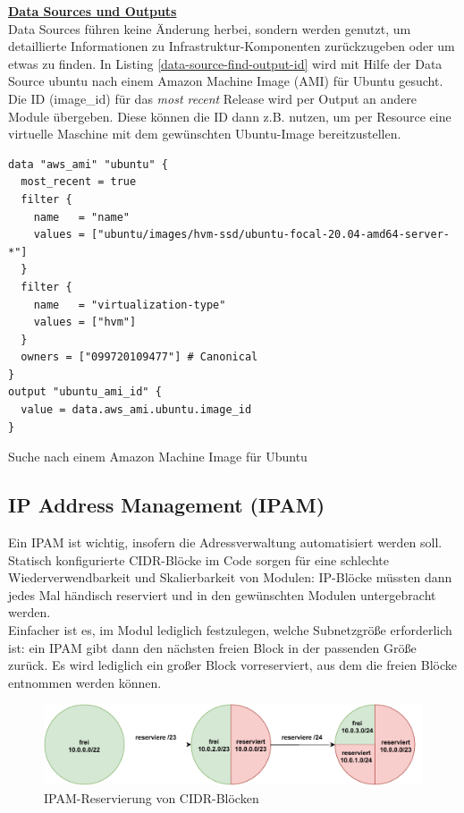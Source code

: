 \textbf{\underline{Data Sources und Outputs}}\\
Data Sources führen keine Änderung herbei, sondern werden genutzt, um detaillierte Informationen zu Infrastruktur-Komponenten zurückzugeben oder um etwas zu finden. In Listing \ref{data-source-find-output-id} wird mit Hilfe der Data Source \glqq ubuntu\grqq{} nach einem Amazon Machine Image (AMI) für Ubuntu gesucht. Die ID (image\_id) für das \textit{most recent} Release wird per Output an andere Module übergeben. Diese können die ID dann z.B. nutzen, um per Resource eine virtuelle Maschine mit dem gewünschten Ubuntu-Image bereitzustellen.
\begin{listing}[h]
\begin{verbatim}
data "aws_ami" "ubuntu" {
  most_recent = true
  filter {
    name   = "name"
    values = ["ubuntu/images/hvm-ssd/ubuntu-focal-20.04-amd64-server-*"]
  }
  filter {
    name   = "virtualization-type"
    values = ["hvm"]
  }
  owners = ["099720109477"] # Canonical
}
output "ubuntu_ami_id" {
  value = data.aws_ami.ubuntu.image_id
}
\end{verbatim}
\caption{Suche nach einem Amazon Machine Image für Ubuntu}
\label{data-source-find-output-id}
\end{listing}\FloatBarrier
\subsection{IP Address Management (IPAM)}
Ein \gls{IPAM} ist wichtig, insofern die Adressverwaltung automatisiert werden soll. Statisch konfigurierte \gls{CIDR}-Blöcke im Code sorgen für eine schlechte Wiederverwendbarkeit und Skalierbarkeit von Modulen: IP-Blöcke müssten dann jedes Mal händisch reserviert und in den gewünschten Modulen untergebracht werden.\\
Einfacher ist es, im Modul lediglich festzulegen, welche Subnetzgröße erforderlich ist: ein \gls{IPAM} gibt dann den nächsten freien Block in der passenden Größe zurück. Es wird lediglich ein großer Block vorreserviert, aus dem die freien Blöcke entnommen werden können.

\begin{figure}[h]
  \centering
  \includegraphics[scale=0.8]{Figures/ipam_cake.pdf}
  \caption{IPAM-Reservierung von \gls{CIDR}-Blöcken}
  \label{grafik: ipam_ip_reservation}
\end{figure}\FloatBarrier
